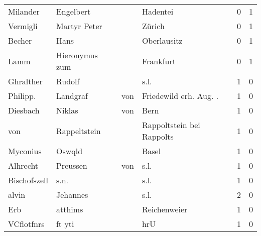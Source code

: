 \documentclass[10pt,a4paper,landscape]{article}
\begin{document}
\begin{longtable}{llllrr}
                 Milander &                          Engelbert &             &                                    Hadentei &          0 &         1 \\
                 Vermigli &                       Martyr Peter &             &                                      Zürich &          0 &         1 \\
                   Becher &                               Hans &             &                                 Oberlausitz &          0 &         1 \\
                     Lamm &                     Hieronymus zum &             &                                   Frankfurt &          0 &         1 \\
                Ghralther &                             Rudolf &             &                                        s.l. &          1 &         0 \\
                 Philipp. &                           Landgraf &         von &                     Friedewild erh. Aug. .  &          1 &         0 \\
                 Diesbach &                             Niklas &         von &                                        Bern &          1 &         0 \\
                      von &                       Rappeltstein &             &                   Rappoltstein bei Rappolts &          1 &         0 \\
                 Myconius &                             Oswqld &             &                                       Basel &          1 &         0 \\
                 Alhrecht &                           Preussen &         von &                                        s.l. &          1 &         0 \\
             Bischofszell &                               s.n. &             &                                        s.l. &          1 &         0 \\
                    alvin &                           Jehannes &             &                                        s.l. &          2 &         0 \\
                      Erb &                            atthims &             &                                Reichenweier &          1 &         0 \\
               VCflotfnrs &                             ft yti &             &                                         hrU &          1 &         0 \\

\end{longtable}
\end{document}
